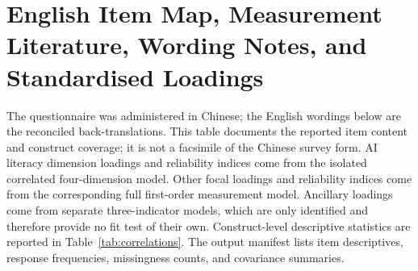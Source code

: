 \documentclass[sustainability,article,accept,moreauthors]{Definitions/mdpi}
\begin{document}



\appendixstart
\appendix



\section{English Item Map, Measurement Literature, Wording Notes, and Standardised Loadings}\label{app:instrument}

The questionnaire was administered in Chinese; the English wordings below are the reconciled back-translations. This table documents the reported item content and construct coverage; it is not a facsimile of the Chinese survey form. AI literacy dimension loadings and reliability indices come from the isolated correlated four-dimension model. Other focal loadings and reliability indices come from the corresponding full first-order measurement model. Ancillary loadings come from separate three-indicator models, which are only identified and therefore provide no fit test of their own. Construct-level descriptive statistics are reported in Table~\ref{tab:correlations}. The output manifest lists item descriptives, response frequencies, missingness counts, and covariance summaries.
\end{document}
